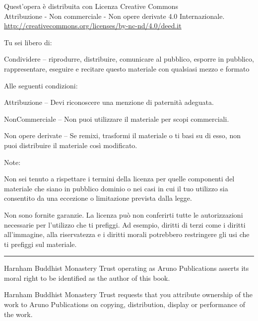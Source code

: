 \vspace*{-2.5\baselineskip}
\enlargethispage{\baselineskip}

{\copyrightsize\setlength{\parindent}{0pt}%
\raggedright\label{copyright-details}
\setlength{\parskip}{3pt}
{\centering

{\large\ccbyncnd}

Quest'opera è distribuita con Licenza Creative Commons\\
Attribuzione - Non commerciale - Non opere derivate 4.0 Internazionale.\\
\href{http://creativecommons.org/licenses/by-nc-nd/4.0/deed.it}{http://creativecommons.org/licenses/by-nc-nd/4.0/deed.it}

}

Tu sei libero di:
\begin{packeditemize}
  \item Condividere -- riprodurre, distribuire, comunicare al pubblico, esporre in pubblico, rappresentare, eseguire e recitare questo materiale con qualsiasi mezzo e formato
\end{packeditemize}

Alle seguenti condizioni:

\begin{packeditemize}
\item Attribuzione -- Devi riconoscere una menzione di paternità adeguata.
\item NonCommerciale -- Non puoi utilizzare il materiale per scopi commerciali.
\item Non opere derivate -- Se remixi, trasformi il materiale o ti basi su di esso, non puoi distribuire il materiale così modificato.
\end{packeditemize}

Note:

Non sei tenuto a rispettare i termini della licenza per quelle componenti del
materiale che siano in pubblico dominio o nei casi in cui il tuo utilizzo sia
consentito da una eccezione o limitazione prevista dalla legge.

Non sono fornite garanzie. La licenza può non conferirti tutte le autorizzazioni
necessarie per l'utilizzo che ti prefiggi. Ad esempio, diritti di terzi come i
diritti all'immagine, alla riservatezza e i diritti morali potrebbero
restringere gli usi che ti prefiggi sul materiale.

{\centering
  \color[gray]{0.4}\rule{0.4\linewidth}{0.1pt}%
\par}

Harnham Buddhist Monastery Trust operating as Aruno Publications asserts its moral right to be identified as the author of this book.

Harnham Buddhist Monastery Trust requests that you attribute ownership of the work to Aruno Publications on copying, distribution, display or performance of the work.

}
